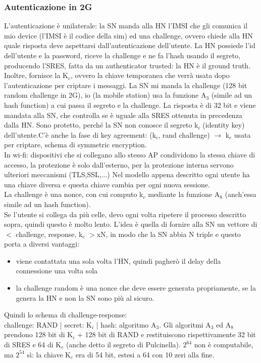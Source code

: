 \documentclass[16px]{article}
\begin{document}
\subsubsection{Autenticazione in 2G}
L'autenticazione è unilaterale: la SN manda alla HN l'IMSI che gli comunica il mio device (l'IMSI è il codice della sim) ed una challenge, ovvero chiede alla HN quale risposta deve aspettarsi dall'autenticazione dell'utente. La HN possiede l'id dell'utente e la password, riceve la challenge e ne fa l'hash usando il segreto, producendo l'SRES, fatta da un authenticator trusted: la HN è il ground truth.\\ Inoltre, fornisce la K$_{c}$, ovvero la chiave temporanea che verrà usata dopo l'autenticazione per criptare i messaggi. La SN mi manda la challenge (128 bit random challenge in 2G), io (la mobile station) usa la funzione A$_{3}$ (simile ad un hash function) a cui passa il segreto e la challenge. La risposta è di 32 bit e viene mandata alla SN, che controlla se è uguale alla SRES ottenuta in precedenza dalla HN. Sono protetto, perché la SN non conosce il segreto k$_{i}$ (identity key) dell'utente.C'è anche la fase di key agreement: (k$_{i}$, rand challenge) $\longrightarrow$ k$_{c}$ usata per criptare, schema di symmetric encryption.\\ In wi-fi: dispositivi che si collegano allo stesso AP condividono la stessa chiave di accesso, la protezione è solo dall'esterno, per la protezione interna servono ulteriori meccanismi (TLS,SSL,...) Nel modello appena descritto ogni utente ha una chiave diversa e questa chiave cambia per ogni nuova sessione.\\ La challenge è una nonce, con cui computo k$_{c}$ mediante la funzione A$_{8}$ (anch'essa simile ad un hash function).\\ Se l'utente si collega da più celle, devo ogni volta ripetere il processo descritto sopra, quindi questo è molto lento. L'idea è quella di fornire alla SN un vettore di $<$ challenge, response, k$_{c}$ $>$xN, in modo che la SN abbia N triple e questo porta a diversi vantaggi:
\begin{itemize}
\item viene contattata una sola volta l'HN, quindi pagherò il delay della connessione una volta sola
\item la challenge random è una nonce che deve essere generata propriamente, se la genera la HN e non la SN sono più al sicuro.
\end{itemize}
Quindi lo schema di challenge-response:\\
challenge: RAND | secret: K$_{i}$ | hash: algoritmo A$_{3}$.
Gli algoritmi A$_{3}$ ed A$_{8}$ prendono 128 bit di K$_{i}$ + 128 bit di RAND e restituiscono rispettivamente 32 bit di SRES e 64 di K$_{c}$ (anche detto il segreto di Pulcinella). $2^{64}$ non è computabile, ma $2^{54}$ sì: la chiave K$_{c}$ era di 54 bit, estesi a 64 con 10 zeri alla fine.
\end{document}
